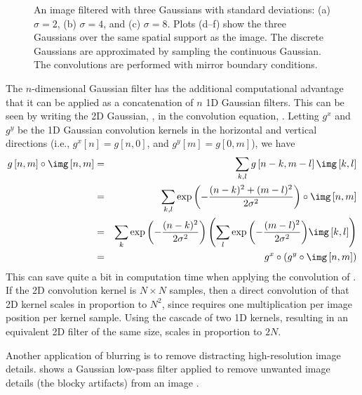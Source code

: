 \begin{figure}[t]
{		%
	}
	\caption{An image filtered with three Gaussians with standard deviations: (a) $\sigma=2$, (b) $\sigma=4$, and (c) $\sigma=8$. Plots (d--f) show the three Gaussians over the same spatial support as the image. The discrete Gaussians are approximated by sampling the continuous Gaussian. The convolutions are performed with mirror boundary conditions.}
	\label{fig:zebragaussian}
\end{figure}


The $n$-dimensional Gaussian filter has the additional computational advantage that it can
be applied as a concatenation of $n$ 1D Gaussian filters.  This can be
seen by writing the 2D Gaussian, \eqn{\ref{eq:gauss2d}}, in the
convolution equation, \eqn{\ref{eq:2dconv}}.  Letting $g^x$
and $g^y$ be the 1D Gaussian convolution kernels in the horizontal
and vertical directions (i.e., $g^x [n]=g[n,0]$, and $g^y[m]=g[0,m]$), we have
\begin{eqnarray*}
	g \left[n,m \right] \circ \img \left[n,m\right]
	& = & \sum_{k,l}
	g \left[n-k,m-l \right] \img \left[k,l \right] \\
	& = & \sum_{k,l}
	\exp{ \left( -\frac{(n-k)^2 + (m-l)^2}{2 \sigma^2} \right) }
	\circ \img \left[n,m \right] \\
	& = &
	\sum_{k}
	\exp{ \left( -\frac{(n-k)^2}{2 \sigma^2} \right) }
	\left(
	\sum_{l}
	\exp{ \left( -\frac{(m-l)^2}{2 \sigma^2} \right) } \img \left[k,l \right]
	\right)
	\\
	& = &
	g^x \circ (g^y \circ \img \left[n,m \right])
	\label{eq:2dgauss}
\end{eqnarray*}
This can save quite a bit in computation time when applying the
convolution of \eqn{\ref{eq:2dgauss}}.  If the 2D convolution kernel
is $N \times N$ samples, then a direct convolution of that 2D kernel scales
in proportion to $N^2$, since \eqn{\ref{eq:2dgauss}} requires one
multiplication per image position per kernel sample.  Using the
cascade of two 1D kernels, resulting in an equivalent 2D filter of
the same size, scales in proportion to $2N$.

Another application of blurring is to remove distracting
high-resolution image details.
\Fig{\ref{fig:lincoln}} shows a Gaussian low-pass filter applied to
remove unwanted image details (the blocky artifacts) from an image \cite{Harmon_1973}.

